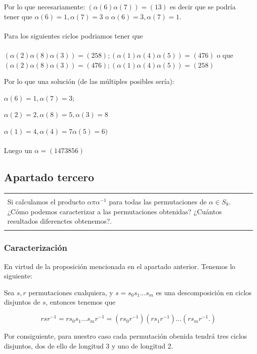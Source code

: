 \documentclass[12pt]{article}
\newenvironment{micaja}
{
    \begin{center}
    \begin{tabular}{|p{0.9\textwidth}|}
    \hline\\
    }   
    {   
    \\\\\hline
    \end{tabular} 
    \end{center}
    }
\begin{document}
Por lo que necesariamente: $(\alpha(6)\alpha(7)) = (1 3)$ es decir que se podría tener que
$\alpha(6)=1, \alpha(7) = 3$ o $\alpha(6)=3, \alpha(7) = 1$.
\paragraph{}
Para los siguientes ciclos podriamos tener que \paragraph{}

$(\alpha(2)\alpha(8)\alpha(3)) = (2 5 8); (\alpha(1) \alpha(4)\alpha(5)) = (4 7 6)$
o que 
$(\alpha(2)\alpha(8)\alpha(3)) = (4 7 6); (\alpha(1) \alpha(4)\alpha(5)) = (2 5 8)$

Por lo que una solución (de las múltiples posibles sería):


$\alpha(6)=1, \alpha(7) = 3$; 

$\alpha(2) = 2, \alpha(8)=5,\alpha(3)=8$

$\alpha(1)=4, \alpha(4)=7\alpha(5)=6)$
\paragraph{}
Luego un $\alpha = (1473856)$


\subsection{Apartado tercero}
\begin{micaja}
Si calculamos el producto $\alpha \pi \alpha^{-1}$ para todas las permutaciones de $\alpha \in S_8.$ ¿Cómo podemos caracterizar a las permutaciones obtenidas? ¿Cuántos resultados diferenctes obtenemos?.
\end{micaja}

\subsubsection*{Caracterización}
En virtud de la proposición mencionada en el apartado anterior.
Tenemos lo siguiente:

Sea $s,r$  permutaciones cualquiera, y $s = s_0 s_1 ...  s_m$ es una descomposición en ciclos disjuntos de $s$, entonces tenemos que

$$r s r^{-1} =r s_0 s_1 ...  s_m r^{-1} = (r s_0 r^{-1}) (r s_1 r^{-1}) ... (r s_m r^{-1}.) $$

Por consiguiente, para nuestro caso cada permutación obenida tendrá tres ciclos disjuntos, dos de ello de longitud 3 y uno de longitud 2. 
\end{document}

